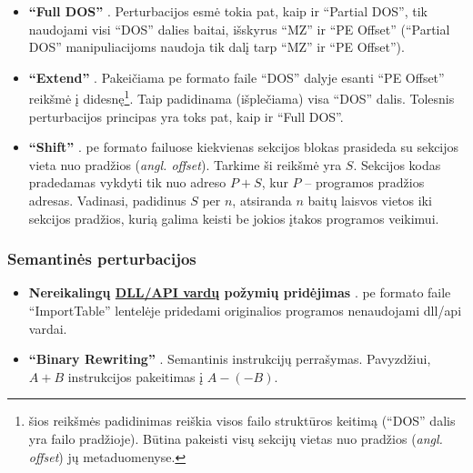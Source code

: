 \begin{itemize}
    \item \textbf{\enquote{Full DOS}} \cite{demetrioAdversarialEXEmplesSurvey2021}. Perturbacijos esmė tokia pat, kaip ir \enquote{Partial DOS}, tik naudojami visi \enquote{DOS} dalies baitai, išskyrus \enquote{MZ} ir \enquote{PE Offset} (\enquote{Partial DOS} manipuliacijoms naudoja tik dalį tarp \enquote{MZ} ir \enquote{PE Offset}).
    \item \textbf{\enquote{Extend}} \cite{demetrioAdversarialEXEmplesSurvey2021}. Pakeičiama \acs{pe} formato faile \enquote{DOS} dalyje esanti \enquote{PE Offset} reikšmė į didesnę\footnote{\label{footnote:structure}šios reikšmės padidinimas reiškia visos failo struktūros keitimą (\enquote{DOS} dalis yra failo pradžioje). Būtina pakeisti visų sekcijų vietas nuo pradžios (\textit{angl. offset}) jų metaduomenyse.}. Taip padidinama (išplečiama) visa \enquote{DOS} dalis. Tolesnis perturbacijos principas yra toks pat, kaip ir \enquote{Full DOS}.
    \item \textbf{\enquote{Shift}} \cite{demetrioAdversarialEXEmplesSurvey2021}. \acs{pe} formato failuose kiekvienas sekcijos blokas prasideda su sekcijos vieta nuo pradžios (\textit{angl. offset}). Tarkime ši reikšmė yra $S$. Sekcijos kodas pradedamas vykdyti tik nuo adreso $P+S$, kur $P$ -- programos pradžios adresas. Vadinasi, padidinus $S$ per $n$, atsiranda $n$ baitų laisvos vietos iki sekcijos pradžios, kurią galima keisti be jokios įtakos programos veikimui.
\end{itemize}
\subsubsection{Semantinės perturbacijos}\label{sec:literature:perturbations:semantic}
\begin{itemize}
    \item \textbf{Nereikalingų \hyperref[feature:dll]{DLL/API vardų} požymių pridėjimas} \cite{huGeneratingAdversarialMalware2017}. \acs{pe} formato faile \enquote{ImportTable} lentelėje pridedami originalios programos nenaudojami \acs{dll}/\acs{api} vardai.
    \item \textbf{\enquote{Binary Rewriting}} \cite{demetrioAdversarialEXEmplesSurvey2021}. Semantinis instrukcijų perrašymas. Pavyzdžiui, $A+B$ instrukcijos pakeitimas į $A-(-B)$.
\end{itemize}

